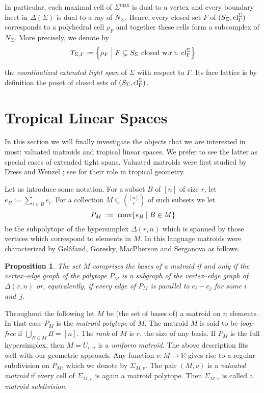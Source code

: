 \documentclass[11pt,a4paper]{amsart}
\theoremstyle{definition}
\theoremstyle{plain}
\newtheorem{prop}[definition]{Proposition}
\begin{document}
In particular, each maximal cell of $\Sigma^{\max}$ is dual to a vertex and every boundary facet in $\Delta(\Sigma)$ is dual to a ray of $N_\Sigma$. Hence, every closed set $F$ of $(S_\Sigma,{\textnormal{cl}}^\Sigma_\Gamma)$ corresponds to a polyhedral cell $\rho_F$ and together these cells form a subcomplex of $N_\Sigma$. More precisely, we denote by
\begin{equation}
T_{\Sigma,\Gamma} := \left\{ \rho_F \;\middle\vert\;F \subsetneq S_\Sigma \textnormal{ closed w.r.t.\ } {\textnormal{cl}}^\Sigma_\Gamma\right\}
\end{equation}

the \emph{coordinatized extended tight span} of $\Sigma$ with respect to $\Gamma$. Its face lattice is by definition the poset of closed sets of $(S_\Sigma,{\textnormal{cl}}^\Sigma_\Gamma)$.

\section{Tropical Linear Spaces}\label{sec:tropli}
\noindent
In this section we will finally investigate the objects that we are interested in most: valuated matroids and tropical linear spaces.
We prefer to see the latter as special cases of extended tight spans.
Valuated matroids were first studied by Dress and Wenzel \cite{DressWenzel:1992}; see \cite[Chapter 4]{Tropical+Book} for their role in tropical geometry.

Let us introduce some notation.
For a subset $B$ of $[n]$ of size $r$, let $e_B := \sum_{i\in B} e_i$.
For a collection $M \subseteq \binom{[n]}{r}$ of such subsets we let
\begin{equation}
P_M \ := \ {{\rm conv}}\{e_B \mid B \in M\}
\end{equation}
be the subpolytope of the hypersimplex $\Delta(r,n)$ which is spanned by those vertices which correspond to elements in $M$.
In this language matroids were characterized by Gelâfand, Goresky, MacPherson and Serganova \cite{GelfandEtAl:1987} as follows.
\begin{prop}\label{prop:matroid}
  The set $M$ comprises the bases of a matroid if and only if the vertex--edge graph of the polytope $P_M$ is a subgraph of the vertex--edge graph of $\Delta(r,n)$ or, equivalently, if every edge of $P_M$ is parallel to $e_i - e_j$ for some $i$ and~$j$.
\end{prop}

Throughout the following let $M$ be (the set of bases of) a matroid on $n$ elements.
In that case $P_M$ is the \emph{matroid polytope} of $M$.
The matroid $M$ is said to be \emph{loop-free} if $\bigcup_{B \in M} B = [n]$.
The \emph{rank} of $M$ is $r$, the size of any basis.
If $P_M$ is the full hypersimplex, then $M = U_{r,n}$ is a \emph{uniform matroid}.
The above description fits well with our geometric approach.
Any function $v: M \to {\mathbb{R}}$ gives rise to a regular subdivision on $P_M$, which we denote by $\Sigma_{M,v}$.
The pair $(M,v)$ is a \emph{valuated matroid} if every cell of $\Sigma_{M,v}$ is again a matroid polytope.
Then $\Sigma_{M,v}$ is called a \emph{matroid subdivision}.
\end{document}
